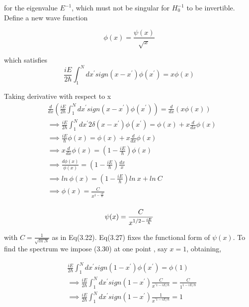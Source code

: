 \documentclass[12pt]{report}
\newcommand*{\1}{\hspace{1pt}}
\begin{document}
        for the eigenvalue $E^{-1}$, which must not be singular for $H_{0}^{-1}$ to be invertible. Define a new wave function 
    
        \begin{equation}
            \phi (x) = \frac{\psi (x)}{\sqrt{x}}
        \end{equation}

        which satisfies 
        \begin{equation}
            \frac{iE}{2\hbar} \int _{1}^{N} dx^{'}sign(x-x^{'})\phi(x^{'})= x\phi(x)
        \end{equation}

        Taking derivative with respect to x 
        \begin{equation}
            \begin{split}
                &\frac{d}{dx}\left(\frac{iE}{2\hbar} \int _{1}^{N} dx^{'}sign(x-x^{'})\phi(x^{'})\right)= \frac{d}{dx}\left( x\phi(x) \right) \\ 
                &\implies \frac{iE}{2\hbar} \int _{1}^{N} dx^{'}2\delta(x-x^{'})\phi(x^{'}) = \phi(x) + x \frac{d}{dx} \phi(x)  \\
                &\implies \frac{iE}{\hbar} \phi(x) = \phi(x) + x \frac{d}{dx} \phi(x)  \\
                &\implies x \frac{d}{dx} \phi(x) = \left(1 - \frac{iE}{\hbar}\right) \phi(x)   \\
                &\implies \frac{d\phi(x)}{\phi(x)} = \left(1 - \frac{iE}{\hbar}\right) \frac{dx}{x}   \\
                &\implies ln \ \phi(x) = \left(1 - \frac{iE}{\hbar}\right) ln \ x + ln \ C   \\
                &\implies \phi(x) = \frac{C}{x^{1 - \frac{iE}{\hbar}}}    \\
            \end{split}
        \end{equation}

        \begin{equation}
            \psi(x) = \frac{C}{x^{1/2 - \frac{iE}{\hbar}}}    \\
        \end{equation}

        with $C=\frac{1}{\sqrt{ln \  N}}$ as in Eq(3.22). Eq(3.27) fixes the functional form of $\psi(x)$. To find the spectrum we impose (3.30) at one point , say $x=1$, 
        obtaining,

        \begin{equation}
            \begin{split}
                &\frac{iE}{2\hbar} \int _{1}^{N} dx^{'} sign(1-x^{'}) \phi(x^{'}) = \phi(1) \\ 
                & \implies \frac{iE}{2\hbar} \int _{1}^{N} dx^{'} sign(1-x^{'}) \frac{C}{x^{' 1 - iE/\hbar}} = \frac{C}{1^{1 - iE/\hbar}} \\
                & \implies \frac{iE}{2\hbar} \int _{1}^{N} dx^{'} sign(1-x^{'}) \frac{1}{x^{' 1 - iE/\hbar}} = 1\\
            \end{split}
        \end{equation}
\end{document}
